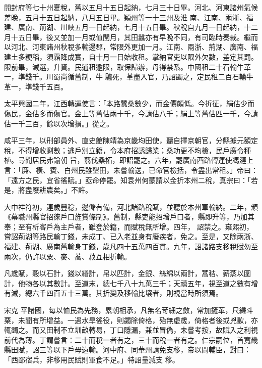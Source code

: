 \begin{pinyinscope}
 開封府等七十州夏稅，舊以五月十五日起納，七月三十日畢。河北、河東諸州氣候差晚，五月十五日起納，八月五日畢。穎州等一十三州及淮
 南、江南、兩浙、福建、廣南、荊湖、川峽五月一日起納，七月十五日畢。秋稅自九月一日起納，十二月十五日畢，後又並加一月或值閏月，其田蠶亦有早晚不同，有司臨時奏裁。繼而以河北、河東諸州秋稅多輸邊郡，常限外更加一月。江南、兩浙、荊湖、廣南、福建土多粳稻，須霜降成實，自十月一日始收租。掌納官吏以限外欠數，差定其罰。限前畢，減選，升資。民逋租逾限，取保歸辦，母得禁系。中國租二十石輸牛革一，準錢千。川蜀尚循舊制，牛
 驢死，革盡入官，乃詔蠲之，定民租二百石輸牛革一，準錢千五百。



 太平興國二年，江西轉運使言：「本路蠶桑數少，而金價頗低。今折征，絹估少而傷民，金估多而傷官。金上等舊估兩十千，今請估八千；絹上等舊估匹一千，今請估一千三百，餘以次增損。」從之。



 咸平三年，以刑部員外、直史館陳靖為京畿均田使，聽自擇京朝官，分縣據元額定稅，不得增收剩數；逃戶別立籍，令本府招誘歸業；桑功更不均檢，民戶廣令種植。尋聞居民弗諭朝
 旨，翦伐桑柘，即詔罷之。六年，罷廣南西路轉運使馮漣上言：「廉、橫、賓、白州民雖墾田，未嘗輸送，已命官檢括，令盡出常租。」帝曰：「遠方之民，宜省徭賦。」亟命停罷。知袁州何蒙請以金折本州二稅，真宗曰：「若是，將盡廢耕農矣。」不許。



 大中祥符初，連歲豐稔，邊儲有備，河北諸路稅賦，並聽於本州軍輸納。二年，頒《幕職州縣官招徠戶口旌賞條制》。舊制，縣吏能招增戶口者，縣即升等，乃加其奉；至有析客戶為主戶者，雖登於籍，而賦稅無所增。四年，
 詔禁之。雍熙初，嘗詔荊湖等路民輸丁錢，未成丁、已入老並身有廢疾者，免之。至是，又除兩浙、福建、荊湖、廣南舊輸身丁錢，歲凡四十五萬四百貫。九年，詔諸路支移稅賦勿至兩次，仍許以粟、麥、蕎、菽互相折輸。



 凡歲賦，穀以石計，錢以緡計，帛以匹計，金銀、絲綿以兩計，蒿秸、薪蒸以圍計，他物各以其數計。至道末，總七千八十九萬三千；天禧五年，視至道之數有增有減，總六千四百五十三萬。其折變及移輸比壤者，則視當時所須焉。



 宋克
 平諸國，每以恤民為先務，累朝相承，凡無名苛細之斂，常加鏟革，尺縑斗粟，未聞有所增益。一遇水旱徭役，則蠲除倚格，殆無虛歲，倚格者後或兇歉，亦輒蠲之。而又田制不立圳畝轉易，丁口隱漏，兼並冒偽，未嘗考按，故賦入之利視前代為薄。丁謂嘗言：二十而稅一者有之，三十而稅一者有之。仁宗嗣位，首寬畿縣田賦，詔三等以下戶毋遠輸。河中府、同華州請免支移，帝以問輔臣，對曰：「西鄙宿兵，非移用民賦則軍食不足。」特詔量減支
 移。




\end{pinyinscope}
